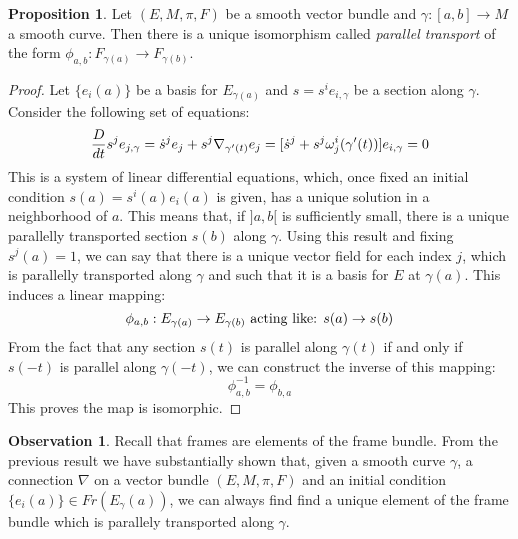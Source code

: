 \documentclass[12pt,a4paper]{report}
\theoremstyle{definition}
\theoremstyle{Theorem}
\newtheorem{Prop}[Def]{Proposition}
\theoremstyle{definition}
\theoremstyle{definition}
\newtheorem{Obs}[Def]{Observation}
\begin{document}
	\begin{Prop}
		Let $(E,M,\pi,F)$ be a smooth vector bundle and $\gamma:[a,b]\rightarrow M$ a smooth curve. Then there is a unique isomorphism called \textit{parallel transport} of the form $\phi_{a,b}:F_{\gamma(a)}\rightarrow F_{\gamma(b)}$.
	\end{Prop}
	\begin{proof}
		Let $\{e_i(a)\}$ be a basis for $E_{\gamma(a)}$ and $s=s^ie_{i,\gamma}$ be a section along $\gamma$. Consider the following set of equations:
		$${D\over dt}{s^je_{j,\gamma}}=\dot{s}^je_j+s^j\nabla_{\gamma'(t)}e_j=[\dot{s}^j+s^j\omega^i_j(\gamma'(t))]e_{i,\gamma}=0$$
		This is a system of linear differential equations, which, once fixed an initial condition $s(a)=s^i(a)e_i(a)$ is given, has a unique solution in a neighborhood of $a$.  This means that, if $]a,b[$ is sufficiently small, there is a unique parallelly transported section $s(b)$ along $\gamma$. Using this result and fixing $s^j(a)=1$, we can say that there is a unique vector field for each index $j$, which is parallelly transported along $\gamma$ and such that it is a basis for $E$ at $\gamma(a)$. This induces a linear mapping:
		$$\phi_{a,b}:E_{\gamma(a)}\rightarrow E_{\gamma(b)}\hbox{ acting like: } s(a)\rightarrow s(b)$$
		From the fact that any section $s(t)$ is parallel along $\gamma(t)$ if and only if $s(-t)$ is parallel along $\gamma(-t)$, we can construct the inverse of this mapping:
		$$\phi^{-1}_{a,b}=\phi_{b,a}$$
		This proves the map is isomorphic.
	\end{proof}
	\begin{Obs}
		Recall that frames are elements of the frame bundle. From the previous result we have substantially shown that, given a smooth curve $\gamma$, a connection $\nabla$ on a vector bundle $(E,M,\pi,F)$ and an initial condition $\{e_i(a)\}\in Fr(E_\gamma(a))$, we can always find find a unique element of the frame bundle which is parallely transported along $\gamma$.
	\end{Obs}
	\begin{comment}
		We now look at the notion of parallel transport on the tangent bundle of a manifold.
		\section{The parallel transport on the tangent bundle}
		In this section we will use the previous results to study the notion of parallel transport on the tangent bundle of a smooth manifold. More information on this topic can be found in [2] chap.3 pag. 95-102.
	\end{comment}
\end{document}
